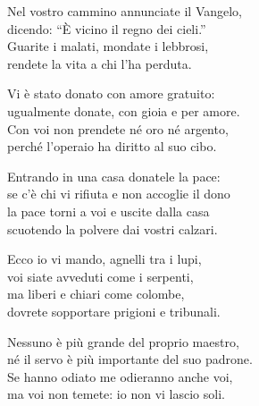 
\strofa Nel vostro cammino annunciate il Vangelo,\\
dicendo: ``È vicino il regno dei cieli.''\\
Guarite i malati, mondate i lebbrosi,\\
rendete la vita a chi l'ha perduta.

\spazio


\spazio

\strofa Vi è stato donato con amore gratuito:\\
ugualmente donate, con gioia e per amore.\\
Con voi non prendete né oro né argento,\\
perché l'operaio ha diritto al suo cibo.

\spazio


\spazio

\strofa Entrando in una casa donatele la pace:\\
se c'è chi vi rifiuta e non accoglie il dono\\
la pace torni a voi e uscite dalla casa\\
scuotendo la polvere dai vostri calzari.

\spazio


\spazio

\strofa Ecco io vi mando, agnelli tra i lupi,\\
voi siate avveduti come i serpenti,\\
ma liberi e chiari come colombe,\\
dovrete sopportare prigioni e tribunali.

\spazio


\spazio

\strofa Nessuno è più grande del proprio maestro,\\
né il servo è più importante del suo padrone.\\
Se hanno odiato me odieranno anche voi,\\
ma voi non temete: io non vi lascio soli.

\spazio

